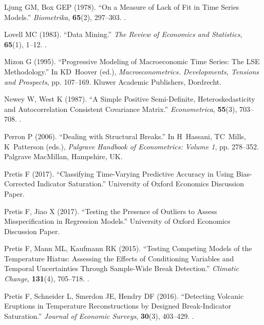 \documentclass[article,nojss]{jss}
\begin{document}
\begin{thebibliography}{56}
	Ljung GM, Box GEP (1978).
	\newblock \enquote{On a Measure of Lack of Fit in Time Series Models.}
	\newblock \emph{Biometrika}, \textbf{65}(2), 297--303.
	\newblock {}.
	
	Lovell MC (1983).
	\newblock \enquote{Data Mining.}
	\newblock \emph{The Review of Economics and Statistics}, \textbf{65}(1), 1--12.
	\newblock {}.
	
	Mizon G (1995).
	\newblock \enquote{Progressive Modeling of Macroeconomic Time Series: The LSE
		Methodology.}
	\newblock In KD~Hoover (ed.), \emph{Macroeconometrics. Developments, Tensions
		and Prospects}, pp. 107--169. Kluwer Academic Publishers, Dordrecht.
	
	Newey W, West K (1987).
	\newblock \enquote{A Simple Positive Semi-Definite, Heteroskedasticity and
		Autocorrelation Consistent Covariance Matrix.}
	\newblock \emph{Econometrica}, \textbf{55}(3), 703--708.
	\newblock {}.
	
	Perron P (2006).
	\newblock \enquote{Dealing with Structural Breaks.}
	\newblock In H~Hassani, TC~Mills, K~Patterson (eds.), \emph{Palgrave Handbook
		of Econometrics: Volume 1}, pp. 278--352. Palgrave MacMillan, Hampshire, UK.
	
	Pretis F (2017).
	\newblock \enquote{Classifying Time-Varying Predictive Accuracy in Using
		Bias-Corrected Indicator Saturation.}
	\newblock University of Oxford Economics Discussion Paper.
	
	Pretis F, Jiao X (2017).
	\newblock \enquote{Testing the Presence of Outliers to Assess Misspecification
		in Regression Models.}
	\newblock University of Oxford Economics Discussion Paper.
	
	Pretis F, Mann ML, Kaufmann RK (2015).
	\newblock \enquote{Testing Competing Models of the Temperature Hiatus:
		Assessing the Effects of Conditioning Variables and Temporal Uncertainties
		Through Sample-Wide Break Detection.}
	\newblock \emph{Climatic Change}, \textbf{131}(4), 705--718.
	\newblock {}.
	
	Pretis F, Schneider L, Smerdon JE, Hendry DF (2016).
	\newblock \enquote{Detecting Volcanic Eruptions in Temperature Reconstructions
		by Designed Break-Indicator Saturation.}
	\newblock \emph{Journal of Economic Surveys}, \textbf{30}(3), 403--429.
	\newblock {}.
	

\end{thebibliography}
\end{document}
